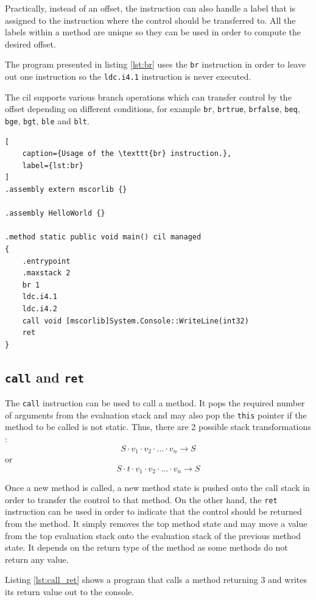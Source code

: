 \documentclass[declaration,shortabstract,english,mgr]{iithesis}
\begin{document}
Practically, instead of an offset, the instruction can also handle a label that is assigned to the instruction where the control should be transferred to. All the labels within a method are unique so they can be used in order to compute the desired offset.

The program presented in listing \ref{lst:br} uses the \texttt{br} instruction in order to leave out one instruction so the \texttt{ldc.i4.1} instruction is never executed.

The \acrshort{cil} supports various branch operations which can transfer control by the offset depending on different conditions, for example \texttt{br}, \texttt{brtrue}, \texttt{brfalse}, \texttt{beq}, \texttt{bge}, \texttt{bgt}, \texttt{ble} and \texttt{blt}.

\begin{lstlisting}[
	caption={Usage of the \texttt{br} instruction.},
	label={lst:br}
]
.assembly extern mscorlib {}

.assembly HelloWorld {}

.method static public void main() cil managed
{
	.entrypoint
	.maxstack 2
	br 1
	ldc.i4.1
	ldc.i4.2
	call void [mscorlib]System.Console::WriteLine(int32)
	ret
}
\end{lstlisting}

\subsection{\texttt{call} and \texttt{ret}}

The \texttt{call} instruction can be used to call a method. It pops the required number of arguments from the evaluation stack and may also pop the \texttt{this} pointer if the method to be called is not static. Thus, there are 2 possible stack transformations \cite{ecmaStandard}:
$$
	S \cdot v_1 \cdot v_2 \cdot ... \cdot v_n \rightarrow S
$$
or
$$
	S \cdot t \cdot v_1 \cdot v_2 \cdot ... \cdot v_n \rightarrow S
$$

Once a new method is called, a new method state is pushed onto the call stack in order to transfer the control to that method. On the other hand, the \texttt{ret} instruction can be used in order to indicate that the control should be returned from the method. It simply removes the top method state and may move a value from the top evaluation stack onto the evaluation stack of the previous method state. It depends on the return type of the method as some methods do not return any value.

Listing \ref{lst:call_ret} shows a program that calls a method returning $3$ and writes its return value out to the console.
\end{document}
